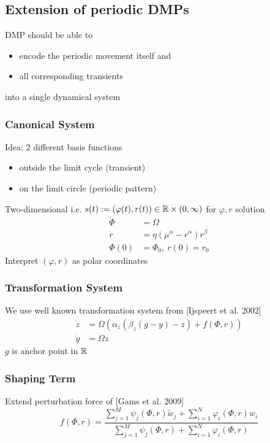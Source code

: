 \subsection{Extension of periodic DMPs}%
\label{ar:sub:extension_of_periodic_dmps}
DMP should be able to
\begin{itemize}
\item encode the periodic movement itself and
\item all corresponding transients
\end{itemize}
into a single dynamical system\\

\subsubsection{Canonical System}%
\label{ar:ssub:canoncial_system}
Idea: 2 different basis functions
\begin{itemize}
\item outside the limit cycle (transient)
\item on the limit circle (periodic pattern)
\end{itemize}

Two-dimensional i.e. \(s(t) := (\varphi(t), r(t)) \in \mathbb{R} \times (0, \infty)\) for \(\varphi, r\) solution
\begin{align*}
  \dot{\Phi} &= \Omega\\
  \dot{r} &= \eta (\mu^\alpha - r^\alpha)r^\beta\\
  \Phi (0) &= \Phi_0,\ r(0) = r_0
\end{align*}
Interpret \((\varphi, r)\) as polar coordinates

\subsubsection{Transformation System}%
\label{ar:ssub:transformation_system}
We use well known transformation system from [Ijspeert et al. 2002]
\begin{align*}
  \dot{z} &= \Omega (\alpha_z (\beta_z ( g - y ) - z ) + f(\Phi, r))\\
  \dot{y} &= \Omega z
\end{align*}
\(g\) is anchor point in \(\mathbb{R}\)

\subsubsection{Shaping Term}%
\label{ar:ssub:shaping_term}
Extend perturbation force of [Gams et al. 2009]
\[
  f(\Phi, r) = \frac{\sum_{j=1}^M \psi_j(\Phi, r) \tilde{w}_j + \sum_{i=1}^N \varphi_i(\Phi, r)w_i}
  {\sum_{j=1}^M \psi_j(\Phi, r) + \sum_{i=1}^N \varphi_i(\Phi, r)}
\]